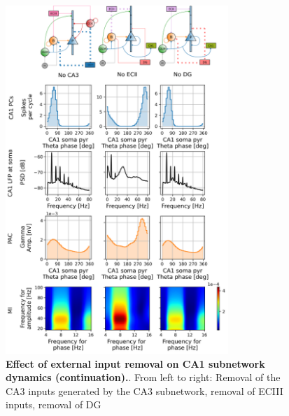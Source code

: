 \documentclass[../main.tex]{subfiles}
\begin{document}
\begin{figure}[htbp]
    \ContinuedFloat %
    \centering
    \includegraphics[width=0.75\textwidth]{chapter4/figures/removing_external_inputs/removing_inputs_lfp_ca1_pt2.png}
    \caption{\textbf{Effect of external input removal on CA1 subnetwork dynamics (continuation).}.  
    From left to right: Removal of the CA3 inputs generated by the CA3 subnetwork, removal of ECIII inputs, removal of DG }
\end{figure}
\end{document}
